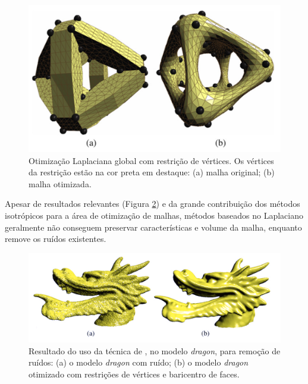 \begin{figure}[!h]
\captionsetup{width=\linewidth}
\centering
\includegraphics[scale=0.25]{figuras/restricao_vertices.png}
\caption{Otimização Laplaciana global com restrição de vértices. Os vértices da restrição estão na cor preta em destaque: (a) malha original; (b) malha otimizada.}
\label{fig:restricao_vertices}
\end{figure}

Apesar de resultados relevantes (Figura \ref{fig:dragon_laplaciano_global}) e da grande contribuição dos métodos isotrópicos para a área de otimização de malhas, métodos baseados no Laplaciano geralmente não conseguem preservar características e volume da malha, enquanto remove os ruídos existentes.

\clearpage

\begin{figure}[!h]
\captionsetup{width=\linewidth}
\centering
\includegraphics[scale=0.28]{figuras/dragon_laplaciano_global.png}
\caption{Resultado do uso da técnica de \cite{liu2007non}, no modelo \textit{dragon}, para remoção de ruídos: (a) o modelo \textit{dragon} com ruído; (b) o modelo \textit{dragon} otimizado com restrições de vértices e baricentro de faces.}
\label{fig:dragon_laplaciano_global}
\end{figure}


